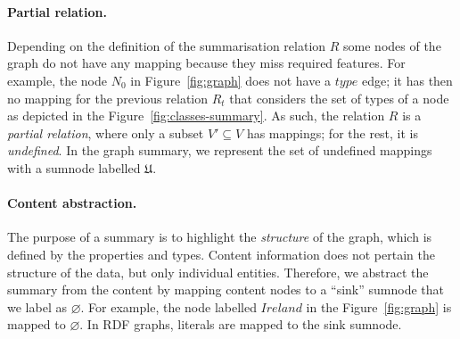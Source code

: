
\paragraph{Partial relation.}

Depending on the definition of the summarisation relation $R$ some nodes of the graph do not have any mapping because they miss required features. For example, the node $N_0$ in Figure~\ref{fig:graph} does not have a $type$ edge; it has then no mapping for the previous relation $R_t$ that considers the set of types of a node as depicted in the Figure~\ref{fig:classes-summary}. As such, the relation $R$ is a \emph{partial relation}, where only a subset $V' \subseteq V$ has mappings; for the rest, it is \emph{undefined}. In the graph summary, we represent the set of undefined mappings with a sumnode labelled $\mathfrak{U}$.

\paragraph{Content abstraction.}

The purpose of a summary is to highlight the \emph{structure} of the graph, which is defined by the properties and types. Content information does not pertain the structure of the data, but only individual entities. Therefore, we abstract the summary from the content by mapping content nodes to a ``sink'' sumnode that we label as $\varnothing$. For example, the node labelled $Ireland$ in the Figure~\ref{fig:graph} is mapped to $\varnothing$. In RDF graphs, literals are mapped to the sink sumnode.

